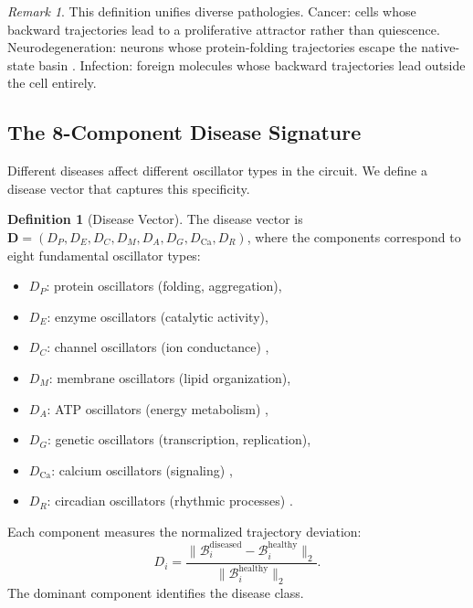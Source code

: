 \documentclass[twocolumn,10pt,a4paper]{article}
\theoremstyle{definition}
\newtheorem{definition}[theorem]{Definition}
\theoremstyle{remark}
\newtheorem{remark}[theorem]{Remark}
\newcommand{\Back}{\mathcal{B}}
\begin{document}
\begin{remark}
This definition unifies diverse pathologies. Cancer: cells whose backward trajectories lead to a proliferative attractor rather than quiescence. Neurodegeneration: neurons whose protein-folding trajectories escape the native-state basin \citep{Levinthal1969}. Infection: foreign molecules whose backward trajectories lead outside the cell entirely.
\end{remark}

\subsection{The 8-Component Disease Signature}

Different diseases affect different oscillator types in the circuit. We define a disease vector that captures this specificity.

\begin{definition}[Disease Vector]
\label{def:disease_vector}
The disease vector is $\mathbf{D} = (D_P, D_E, D_C, D_M, D_A, D_G, D_{\mathrm{Ca}}, D_R)$, where the components correspond to eight fundamental oscillator types:
\begin{itemize}[nosep]
    \item $D_P$: protein oscillators (folding, aggregation),
    \item $D_E$: enzyme oscillators (catalytic activity),
    \item $D_C$: channel oscillators (ion conductance) \citep{Hille2001},
    \item $D_M$: membrane oscillators (lipid organization),
    \item $D_A$: ATP oscillators (energy metabolism) \citep{NichollsFerguson2002},
    \item $D_G$: genetic oscillators (transcription, replication),
    \item $D_{\mathrm{Ca}}$: calcium oscillators (signaling) \citep{Murray2002},
    \item $D_R$: circadian oscillators (rhythmic processes) \citep{Strogatz1994}.
\end{itemize}
Each component measures the normalized trajectory deviation:
\begin{equation}
    D_i = \frac{\|\Back_i^{\mathrm{diseased}} - \Back_i^{\mathrm{healthy}}\|_2}{\|\Back_i^{\mathrm{healthy}}\|_2}.
    \label{eq:disease_component}
\end{equation}
The dominant component identifies the disease class.
\end{definition}
\end{document}
